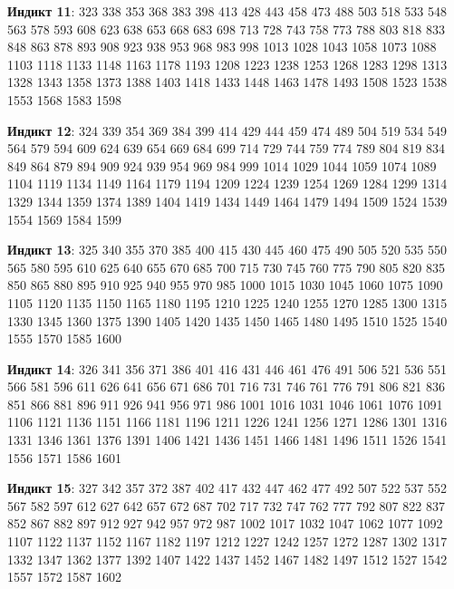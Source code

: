 \textbf{Индикт 11}: 323 338 353 368 383 398 413 428 443 458 473 488 503 518 533 548 563 578 593 608 623 638 653 668 683 698 713 728 743 758 773 788 803 818 833 848 863 878 893 908 923 938 953 968 983 998 1013 1028 1043 1058 1073 1088 1103 1118 1133 1148 1163 1178 1193 1208 1223 1238 1253 1268 1283 1298 1313 1328 1343 1358 1373 1388 1403 1418 1433 1448 1463 1478 1493 1508 1523 1538 1553 1568 1583 1598

\textbf{Индикт 12}: 324 339 354 369 384 399 414 429 444 459 474 489 504 519 534 549 564 579 594 609 624 639 654 669 684 699 714 729 744 759 774 789 804 819 834 849 864 879 894 909 924 939 954 969 984 999 1014 1029 1044 1059 1074 1089 1104 1119 1134 1149 1164 1179 1194 1209 1224 1239 1254 1269 1284 1299 1314 1329 1344 1359 1374 1389 1404 1419 1434 1449 1464 1479 1494 1509 1524 1539 1554 1569 1584 1599

\textbf{Индикт 13}: 325 340 355 370 385 400 415 430 445 460 475 490 505 520 535 550 565 580 595 610 625 640 655 670 685 700 715 730 745 760 775 790 805 820 835 850 865 880 895 910 925 940 955 970 985 1000 1015 1030 1045 1060 1075 1090 1105 1120 1135 1150 1165 1180 1195 1210 1225 1240 1255 1270 1285 1300 1315 1330 1345 1360 1375 1390 1405 1420 1435 1450 1465 1480 1495 1510 1525 1540 1555 1570 1585 1600

\textbf{Индикт 14}: 326 341 356 371 386 401 416 431 446 461 476 491 506 521 536 551 566 581 596 611 626 641 656 671 686 701 716 731 746 761 776 791 806 821 836 851 866 881 896 911 926 941 956 971 986 1001 1016 1031 1046 1061 1076 1091 1106 1121 1136 1151 1166 1181 1196 1211 1226 1241 1256 1271 1286 1301 1316 1331 1346 1361 1376 1391 1406 1421 1436 1451 1466 1481 1496 1511 1526 1541 1556 1571 1586 1601

\textbf{Индикт 15}: 327 342 357 372 387 402 417 432 447 462 477 492 507 522 537 552 567 582 597 612 627 642 657 672 687 702 717 732 747 762 777 792 807 822 837 852 867 882 897 912 927 942 957 972 987 1002 1017 1032 1047 1062 1077 1092 1107 1122 1137 1152 1167 1182 1197 1212 1227 1242 1257 1272 1287 1302 1317 1332 1347 1362 1377 1392 1407 1422 1437 1452 1467 1482 1497 1512 1527 1542 1557 1572 1587 1602
